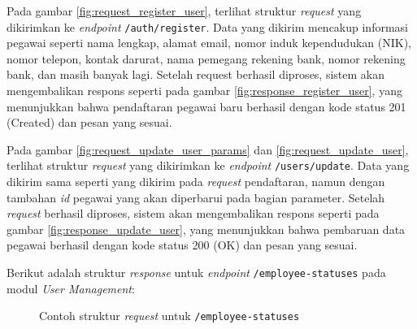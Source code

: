 Pada gambar \ref{fig:request_register_user}, terlihat struktur \textit{request} yang dikirimkan ke \textit{endpoint} \texttt{/auth/register}. Data yang dikirim mencakup informasi pegawai seperti nama lengkap, alamat email, nomor induk kependudukan (NIK), nomor telepon, kontak darurat, nama pemegang rekening bank, nomor rekening bank, dan masih banyak lagi. Setelah request berhasil diproses, sistem akan mengembalikan respons seperti pada gambar \ref{fig:response_register_user}, yang menunjukkan bahwa pendaftaran pegawai baru berhasil dengan kode status 201 (Created) dan pesan yang sesuai.

Pada gambar \ref{fig:request_update_user_params} dan \ref{fig:request_update_user}, terlihat struktur \textit{request} yang dikirimkan ke \textit{endpoint} \texttt{/users/update}. Data yang dikirim sama seperti yang dikirim pada \textit{request} pendaftaran, namun dengan tambahan \textit{id} pegawai yang akan diperbarui pada bagian parameter. Setelah \textit{request} berhasil diproses, sistem akan mengembalikan respons seperti pada gambar \ref{fig:response_update_user}, yang menunjukkan bahwa pembaruan data pegawai berhasil dengan kode status 200 (OK) dan pesan yang sesuai.

Berikut adalah struktur \textit{response} untuk \textit{endpoint} \texttt{/employee-statuses} pada modul \textit{User Management}:
\begin{figure}
    \centering
    \caption{Contoh struktur \textit{request} untuk \texttt{/employee-statuses}}
    \label{fig:request_employee_statuses}
\end{figure}

